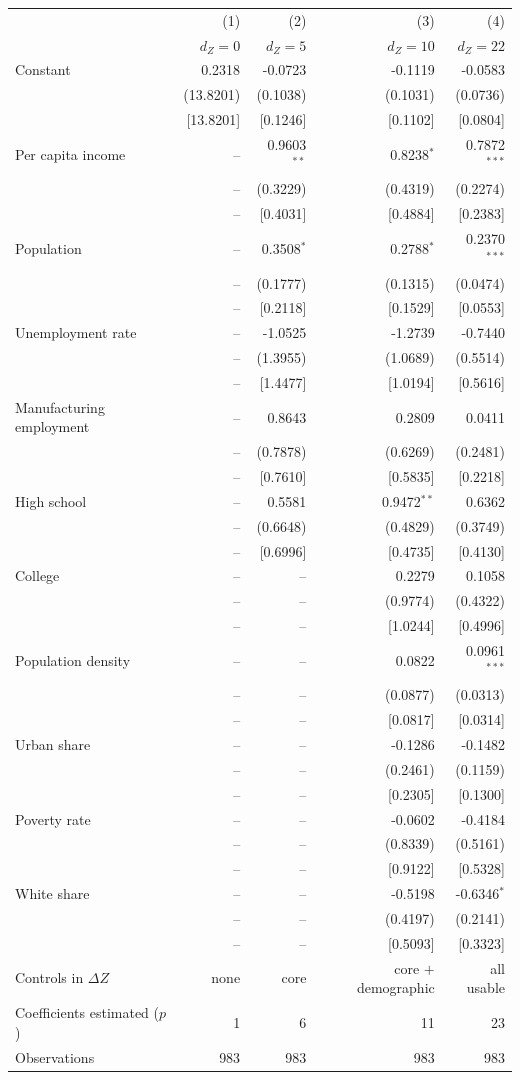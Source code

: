 \begin{tabular}{lrrrr}
\toprule
& (1) & (2) & (3) & (4) \\
& $d_Z = 0$ & $d_Z = 5$ & $d_Z = 10$ & $d_Z = 22$ \\
\midrule
Constant & 0.2318 & -0.0723 & -0.1119 & -0.0583 \\
 & (13.8201) & (0.1038) & (0.1031) & (0.0736) \\
 & [13.8201] & [0.1246] & [0.1102] & [0.0804] \\
Per capita income & -- & 0.9603$^{**}$ & 0.8238$^{*}$ & 0.7872$^{***}$ \\
 & -- & (0.3229) & (0.4319) & (0.2274) \\
 & -- & [0.4031] & [0.4884] & [0.2383] \\
Population & -- & 0.3508$^{*}$ & 0.2788$^{*}$ & 0.2370$^{***}$ \\
 & -- & (0.1777) & (0.1315) & (0.0474) \\
 & -- & [0.2118] & [0.1529] & [0.0553] \\
Unemployment rate & -- & -1.0525 & -1.2739 & -0.7440 \\
 & -- & (1.3955) & (1.0689) & (0.5514) \\
 & -- & [1.4477] & [1.0194] & [0.5616] \\
Manufacturing employment & -- & 0.8643 & 0.2809 & 0.0411 \\
 & -- & (0.7878) & (0.6269) & (0.2481) \\
 & -- & [0.7610] & [0.5835] & [0.2218] \\
High school & -- & 0.5581 & 0.9472$^{**}$ & 0.6362 \\
 & -- & (0.6648) & (0.4829) & (0.3749) \\
 & -- & [0.6996] & [0.4735] & [0.4130] \\
College & -- & -- & 0.2279 & 0.1058 \\
 & -- & -- & (0.9774) & (0.4322) \\
 & -- & -- & [1.0244] & [0.4996] \\
Population density & -- & -- & 0.0822 & 0.0961$^{***}$ \\
 & -- & -- & (0.0877) & (0.0313) \\
 & -- & -- & [0.0817] & [0.0314] \\
Urban share & -- & -- & -0.1286 & -0.1482 \\
 & -- & -- & (0.2461) & (0.1159) \\
 & -- & -- & [0.2305] & [0.1300] \\
Poverty rate & -- & -- & -0.0602 & -0.4184 \\
 & -- & -- & (0.8339) & (0.5161) \\
 & -- & -- & [0.9122] & [0.5328] \\
White share & -- & -- & -0.5198 & -0.6346$^{*}$ \\
 & -- & -- & (0.4197) & (0.2141) \\
 & -- & -- & [0.5093] & [0.3323] \\
\midrule
Controls in $\Delta Z$ & none & core & core $+$ demographic & all usable \\
Coefficients estimated ($p$) & 1 & 6 & 11 & 23 \\
Observations & 983 & 983 & 983 & 983 \\
\bottomrule
\end{tabular}
